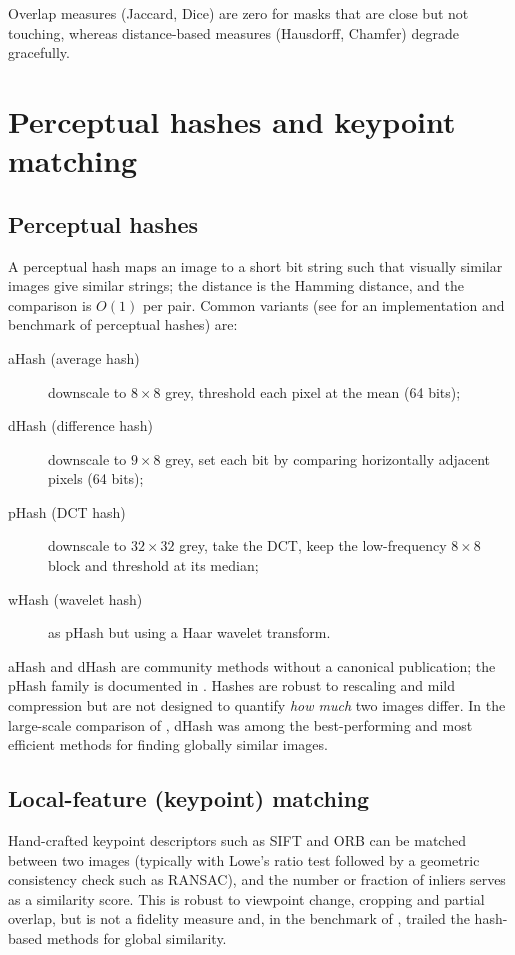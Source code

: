 Overlap measures (Jaccard, Dice) are zero for masks that are close but not touching, whereas distance-based measures (Hausdorff, Chamfer) degrade gracefully.

\section{Perceptual hashes and keypoint matching}

\subsection{Perceptual hashes}
A perceptual hash maps an image to a short bit string such that visually similar images give similar strings; the distance is the Hamming distance, and the comparison is $O(1)$ per pair. Common variants (see \citet{zauner2010} for an implementation and benchmark of perceptual hashes) are:

\begin{description}
  \item[aHash (average hash)] downscale to $8\times8$ grey, threshold each pixel at the mean (64 bits);
  \item[dHash (difference hash)] downscale to $9\times8$ grey, set each bit by comparing horizontally adjacent pixels (64 bits);
  \item[pHash (DCT hash)] downscale to $32\times32$ grey, take the DCT, keep the low-frequency $8\times8$ block and threshold at its median;
  \item[wHash (wavelet hash)] as pHash but using a Haar wavelet transform.
\end{description}

aHash and dHash are community methods without a canonical publication; the pHash family is documented in \citet{zauner2010}. Hashes are robust to rescaling and mild compression but are not designed to quantify \emph{how much} two images differ. In the large-scale comparison of \citet{vallez2022needle}, dHash was among the best-performing and most efficient methods for finding globally similar images.

\subsection{Local-feature (keypoint) matching}
Hand-crafted keypoint descriptors such as SIFT \citep{lowe2004} and ORB \citep{rublee2011} can be matched between two images (typically with Lowe's ratio test followed by a geometric consistency check such as RANSAC), and the number or fraction of inliers serves as a similarity score. This is robust to viewpoint change, cropping and partial overlap, but is not a fidelity measure and, in the benchmark of \citet{vallez2022needle}, trailed the hash-based methods for global similarity.

